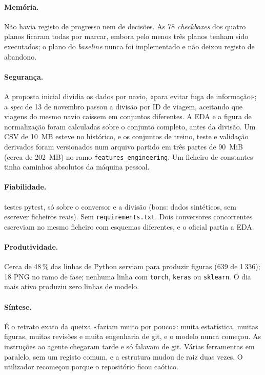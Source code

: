 \documentclass[11pt,a4paper]{article}
\begin{document}
\paragraph{Memória.} Não havia registo de progresso nem de decisões. As 78
\emph{checkboxes} dos quatro planos ficaram todas por marcar, embora pelo menos três planos
tenham sido executados; o plano do \emph{baseline} nunca foi implementado e não deixou registo
de abandono.

\paragraph{Segurança.} A proposta inicial dividia os dados por navio, «para evitar fuga
de informação»; a \emph{spec} de 13 de novembro passou a divisão por ID de viagem, aceitando que
viagens do mesmo navio caíssem em conjuntos diferentes. A EDA e a figura de normalização foram
calculadas sobre o conjunto completo, antes da divisão. Um CSV de 10~MB esteve no histórico, e os
conjuntos de treino, teste e validação derivados foram versionados num arquivo partido em três
partes de 90~MiB (cerca de 202~MB) no ramo \texttt{features\_engineering}. Um ficheiro de
constantes tinha caminhos absolutos da máquina pessoal.

\paragraph{Fiabilidade.} \mUmFuncTestes{} testes pytest, só sobre o conversor e a
divisão (bons: dados sintéticos, sem escrever ficheiros reais). Sem \texttt{requirements.txt}.
Dois conversores concorrentes escreviam no mesmo ficheiro com esquemas diferentes, e o oficial
partia a EDA.

\paragraph{Produtividade.} Cerca de 48\,\% das linhas de Python serviam para produzir
figuras (639 de 1\,336); 18 PNG no ramo de fase; nenhuma linha com \texttt{torch},
\texttt{keras} ou \texttt{sklearn}. O dia mais ativo produziu zero linhas de modelo.

\paragraph{Síntese.} É o retrato exato da queixa «faziam muito por pouco»: muita estatística, muitas figuras, muitas
revisões e muita engenharia de git, e o modelo nunca começou. As instruções ao agente chegaram
tarde e só falavam de git. Várias ferramentas em paralelo, sem um registo comum, e a estrutura
mudou de raiz duas vezes. O utilizador recomeçou porque o repositório ficou caótico.
\end{document}

